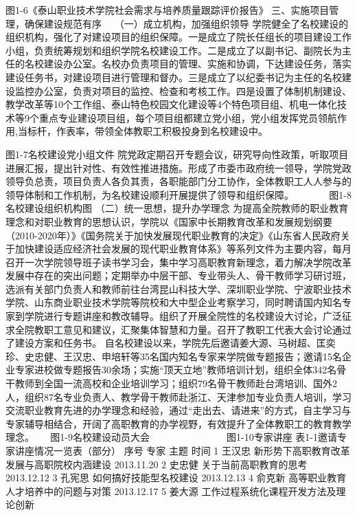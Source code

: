 图1-6《泰山职业技术学院社会需求与培养质量跟踪评价报告》
三、实施项目管理，确保建设规范有序　
（一）成立机构，加强组织领导
学院健全了名校建设的组织机构，强化了对建设项目的组织保障。一是成立了院长任组长的项目建设工作小组，负责统筹规划和组织学院名校建设工作。二是成立了以副书记、副院长为主任的名校建设办公室。名校办负责项目的管理、实施和协调，下达建设任务，落实建设任务书，对建设项目进行管理和督办。三是成立了以纪委书记为主任的名校建设监控办公室，负责对项目的监控、检查和考核工作。四是设置了体制机制建设、教学改革等10个工作组、泰山特色校园文化建设等4个特色项目组、机电一体化技术等9个重点专业建设项目组，每个项目组都建立党小组，党小组发挥党员领航作用,当标杆，作表率，带领全体教职工积极投身到名校建设中。
   
图1-7名校建设党小组文件
院党政定期召开专题会议，研究导向性政策，听取项目进展汇报，提出针对性、有效性推进措施。形成了市委市政府统一领导，学院党政领导负总责，项目负责人各负其责，各职能部门分工协作，全体教职工人人参与的领导体制和工作机制，为名校建设顺利开展提供了领导和组织保障。
  　　　
图1-8名校建设组织机构图
（二）统一思想，提升办学理念
为提高全院教师的职业教育理念和对职业教育的思想认识，学院以《国家中长期教育改革和发展规划纲要（2010-2020年）》《国务院关于加快发展现代职业教育的决定》《山东省人民政府关于加快建设适应经济社会发展的现代职业教育体系》等系列文件为主要内容，每月召开一次学院领导班子读书学习会，集中学习高职教育新理念，着力解决学院改革发展中存在的突出问题；定期举办中层干部、专业带头人、骨干教师学习研讨班，选派有关部门负责人和教师前往台湾昆山科技大学、深圳职业学院、宁波职业技术学院、山东商业职业技术学院等院校和大中型企业考察学习，同时聘请国内知名专家到学院进行专题讲座和教改辅导。组织了开展全院性的名校建设大讨论，广泛征求全院教职工意见和建议，汇聚集体智慧和力量。召开了教职工代表大会讨论通过了建设方案和任务书。
自名校建设以来，学院先后邀请姜大源、马树超、匡奕珍、史忠健、王汉忠、申培轩等35名国内知名专家来学院做专题报告；邀请15名企业专家进校做专题报告30余场；实施“顶天立地”教师培训计划，组织全体342名骨干教师到全国一流高校和企业培训学习；组织79名骨干教师赴台湾培训、国外2人，组织87名专业负责人、教学骨干教师赴浙江、天津参加专业负责人培训，学习交流职业教育先进的办学理念和经验，通过“走出去、请进来”的方式，自主学习与专家辅导相结合，开阔了高职教育的办学视野，有效提升了全体教职工的教育教学理念。
　
图1-9名校建设动员大会　　　　　　　　图1-10专家讲座
表1-1邀请专家讲座情况一览表（部分）
序号
专家
主题
时间
1
王汉忠
新形势下高职教育改革发展与高职院校内涵建设
2013.11.20
2
史忠健
关于当前高职教育的思考
2013.12.12
3
孔宪思
如何搞好技能型名校建设
2013.12.13
4
俞克新
高等职业教育人才培养中的问题与对策
2013.12.17
5
姜大源
工作过程系统化课程开发方法及理论创新
